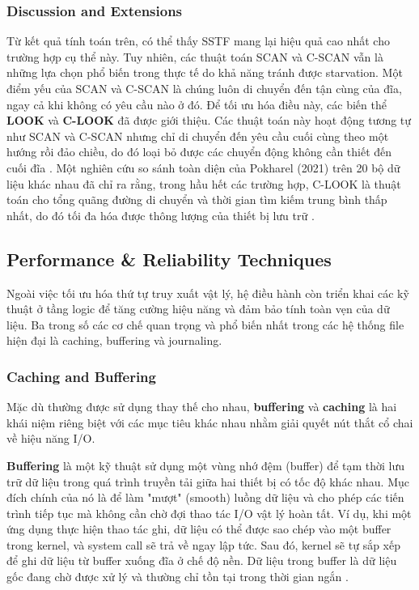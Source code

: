 \documentclass[12pt]{article}
\begin{document}
\subsubsection{Discussion and Extensions}
Từ kết quả tính toán trên, có thể thấy SSTF mang lại hiệu quả cao nhất cho trường hợp cụ thể này. Tuy nhiên, các thuật toán SCAN và C-SCAN vẫn là những lựa chọn phổ biến trong thực tế do khả năng tránh được starvation. Một điểm yếu của SCAN và C-SCAN là chúng luôn di chuyển đến tận cùng của đĩa, ngay cả khi không có yêu cầu nào ở đó. Để tối ưu hóa điều này, các biến thể \textbf{LOOK} và \textbf{C-LOOK} đã được giới thiệu. Các thuật toán này hoạt động tương tự như SCAN và C-SCAN nhưng chỉ di chuyển đến yêu cầu cuối cùng theo một hướng rồi đảo chiều, do đó loại bỏ được các chuyển động không cần thiết đến cuối đĩa \parencite{KansalDiskScheduling, Pokharel2021}. Một nghiên cứu so sánh toàn diện của Pokharel (2021) trên 20 bộ dữ liệu khác nhau đã chỉ ra rằng, trong hầu hết các trường hợp, C-LOOK là thuật toán cho tổng quãng đường di chuyển và thời gian tìm kiếm trung bình thấp nhất, do đó tối đa hóa được thông lượng của thiết bị lưu trữ \parencite{Pokharel2021}.


\subsection{Performance \& Reliability Techniques}
Ngoài việc tối ưu hóa thứ tự truy xuất vật lý, hệ điều hành còn triển khai các kỹ thuật ở tầng logic để tăng cường hiệu năng và đảm bảo tính toàn vẹn của dữ liệu. Ba trong số các cơ chế quan trọng và phổ biến nhất trong các hệ thống file hiện đại là caching, buffering và journaling.

\subsubsection{Caching and Buffering}
Mặc dù thường được sử dụng thay thế cho nhau, \textbf{buffering} và \textbf{caching} là hai khái niệm riêng biệt với các mục tiêu khác nhau nhằm giải quyết nút thắt cổ chai về hiệu năng I/O.

\textbf{Buffering} là một kỹ thuật sử dụng một vùng nhớ đệm (buffer) để tạm thời lưu trữ dữ liệu trong quá trình truyền tải giữa hai thiết bị có tốc độ khác nhau. Mục đích chính của nó là để làm "mượt" (smooth) luồng dữ liệu và cho phép các tiến trình tiếp tục mà không cần chờ đợi thao tác I/O vật lý hoàn tất. Ví dụ, khi một ứng dụng thực hiện thao tác ghi, dữ liệu có thể được sao chép vào một buffer trong kernel, và system call sẽ trả về ngay lập tức. Sau đó, kernel sẽ tự sắp xếp để ghi dữ liệu từ buffer xuống đĩa ở chế độ nền. Dữ liệu trong buffer là dữ liệu gốc đang chờ được xử lý và thường chỉ tồn tại trong thời gian ngắn \parencite{GeeksForGeeks2025BufferCache}.
\end{document}
